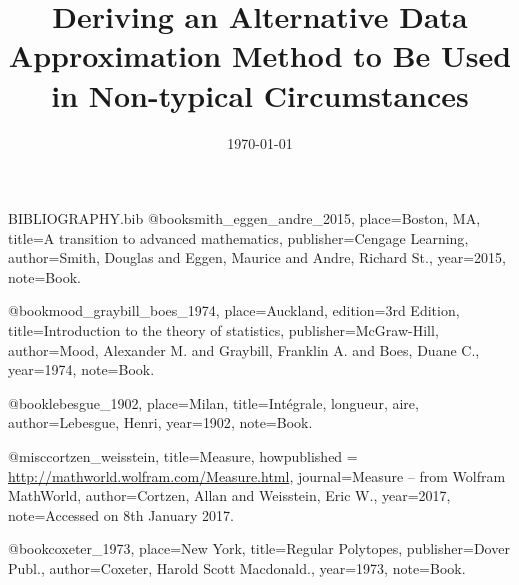 \begin{filecontents}{BIBLIOGRAPHY.bib}
@book{smith_eggen_andre_2015,
 place={Boston, MA}, 
 title={A transition to advanced mathematics}, 
 publisher={Cengage Learning}, 
 author={Smith, Douglas and Eggen, Maurice and Andre, Richard St.}, 
 year={2015},
 note={Book.}}

@book{mood_graybill_boes_1974, 
 place={Auckland}, 
 edition={3rd Edition}, 
 title={Introduction to the theory of statistics}, 
 publisher={McGraw-Hill}, 
 author={Mood, Alexander M. and Graybill, Franklin A. and Boes, Duane C.}, 
 year={1974},
 note={Book.}}

@book{lebesgue_1902, 
 place={Milan}, 
 title={Intégrale, longueur, aire}, 
 author={Lebesgue, Henri}, 
 year={1902},
 note={Book.}}
 
@misc{cortzen_weisstein, 
 title={Measure}, 
 howpublished = {\url{http://mathworld.wolfram.com/Measure.html}}, 
 journal={Measure -- from Wolfram MathWorld}, 
 author={Cortzen, Allan and Weisstein, Eric W.},
 year={2017},
 note={Accessed on 8th January 2017.}}
 
@book{coxeter_1973, 
 place={New York}, 
 title={Regular Polytopes}, 
 publisher={Dover Publ.}, 
 author={Coxeter, Harold Scott Macdonald.}, 
 year={1973},
 note={Book.}}

\end{filecontents}
\documentclass[11pt,a4paper]{article}
\usepackage{graphicx}
\graphicspath{ {images/} }
\usepackage{url}
\usepackage[angle, numbers, sort]{natbib}
\usepackage[rightcaption]{sidecap}
\usepackage{svg}
\usepackage{transparent}
\usepackage{xcolor}
\usepackage{relsize}
\usepackage{amsmath}
\usepackage{amsfonts}
\usepackage[margin=2cm]{geometry}
\usepackage{fancyhdr}
\usepackage{enumitem}
\pagestyle{fancy}
\usepackage{float}
\usepackage{cancel}
\usepackage{subfig}
\usepackage{multirow}
\usepackage{varioref}
\usepackage{mathtools}
\usepackage{amssymb}
\usepackage[margin=2cm]{caption}
\usepackage[nottoc,numbib]{tocbibind}
\usepackage[utf8]{inputenc}





\fancyhf{}               
\fancyhead[L]{\rightmark}   
\fancyhead[C]{\thepage}


\title{Deriving an Alternative Data Approximation Method to Be Used in Non-typical  Circumstances}
\date{\today}

\newcommand{\vecc}{\vec{\textbf{c}}}


